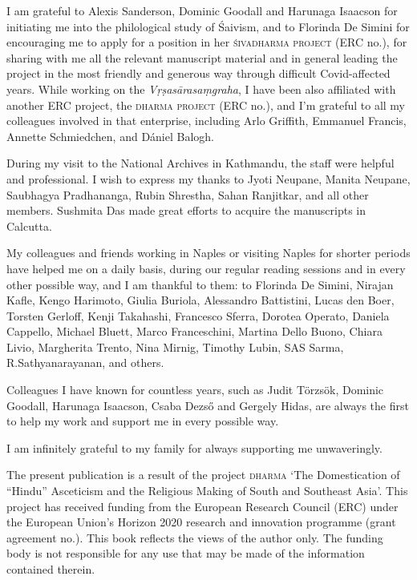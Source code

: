 \documentclass[11pt]{book}
\begin{document}
\noindent
I am grateful to Alexis Sanderson, Dominic Goodall and 
Harunaga Isaacson for initiating me into the philological 
study of Śaivism, and to Florinda De Simini for
encouraging me to apply for a position in her 
\textsc{\hbox{śivadharma} project} (ERC no.),
for sharing with me all the relevant manuscript material and
in general leading the project in the most friendly and 
generous way through difficult Covid-affected years.  
While working on the \textsl{Vṛṣa\-sāra\-saṃgraha}, 
I have been also affiliated with another ERC project, 
the \textsc{dharma project} (ERC no.), 
and I'm grateful to all my colleagues involved in that enterprise,
including Arlo Griffith, Emmanuel Francis, Annette Schmiedchen, and
Dániel Balogh.

During my visit to the National Archives in Kathmandu, 
the staff were helpful and professional. I wish to express my thanks to Jyoti Neupane, Manita Neupane, Saubhagya Pradhananga, Rubin Shrestha, Sahan Ranjitkar, and all %
other members. Sushmita Das made great efforts to acquire the manuscripts in Calcutta.

My colleagues and friends working in Naples or visiting Naples for shorter periods have helped me on a daily basis, during our regular reading sessions and in every other possible way, and I am thankful to them: to Florinda De Simini, Nirajan Kafle, Kengo Harimoto, Giulia Buriola, Alessandro Battistini, Lucas den Boer, Torsten Gerloff, Kenji Takahashi, Francesco Sferra, Dorotea Operato, Daniela Cappello, Michael Bluett, Marco Franceschini, Martina Dello Buono, Chiara Livio, Margherita Trento, Nina Mirnig, Timothy Lubin, SAS Sarma, R.\thinspace Sathyanarayanan, and others.

Colleagues I have known for countless years, such as Judit Törzsök, Dominic Goodall, Harunaga Isaacson, Csaba Dezső 
and Gergely Hidas, are always the first
to help my work and support me in every possible way.

I am infinitely grateful to my family for always supporting me unwaveringly.

\bigskip

\noindent
{\footnotesize
The present publication is a result of the project \textsc{dharma} `The
Domestication of ``Hindu'' Asceticism and the Religious Making of South and Southeast Asia'.  This project has received funding from the European Research Council (ERC) under the European Union's Horizon 2020 research and innovation programme (grant agreement no.).  This book reflects the views of the author only.  The funding body is not responsible for any use that
may be made of the information contained therein.}
\end{document}
